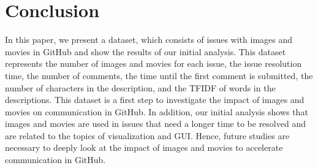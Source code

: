 \section{Conclusion}
\label{sec:conclusion}

In this paper, we present a dataset, 
which consists of issues with images and movies 
in GitHub and show the results of our initial analysis. 
This dataset represents the number of images and movies 
for each issue, 
the issue resolution time, 
the number of comments, 
the time until the first comment is submitted, 
the number of characters in the description, 
and the TFIDF of words in the descriptions. 
This dataset is a first step to investigate 
the impact of images and movies on communication in GitHub. 
In addition, our initial analysis shows that images and movies 
are used in issues that need a longer time to be resolved and 
are related to the topics of visualization and GUI. 
Hence, future studies are necessary to deeply look at 
the impact of images and movies to accelerate communication 
in GitHub.


